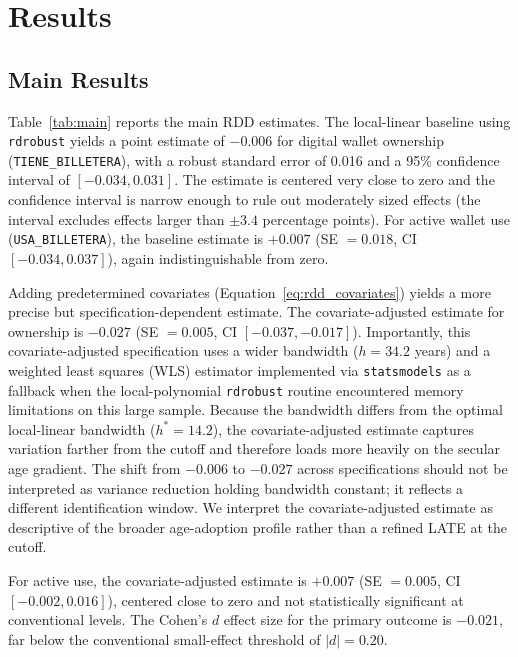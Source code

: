 \documentclass[12pt]{article}
\begin{document}
\section{Results}
\label{sec:results}

\subsection{Main Results}

Table~\ref{tab:main} reports the main RDD estimates. The local-linear baseline using \texttt{rdrobust} yields a point estimate of $-0.006$ for digital wallet ownership (\texttt{TIENE\_BILLETERA}), with a robust standard error of 0.016 and a 95\% confidence interval of $[-0.034, 0.031]$. The estimate is centered very close to zero and the confidence interval is narrow enough to rule out moderately sized effects (the interval excludes effects larger than $\pm 3.4$ percentage points). For active wallet use (\texttt{USA\_BILLETERA}), the baseline estimate is $+0.007$ (SE $=0.018$, CI $[-0.034, 0.037]$), again indistinguishable from zero.

Adding predetermined covariates (Equation~\ref{eq:rdd_covariates}) yields a more precise but specification-dependent estimate. The covariate-adjusted estimate for ownership is $-0.027$ (SE $=0.005$, CI $[-0.037, -0.017]$). Importantly, this covariate-adjusted specification uses a wider bandwidth ($h = 34.2$ years) and a weighted least squares (WLS) estimator implemented via \texttt{statsmodels} as a fallback when the local-polynomial \texttt{rdrobust} routine encountered memory limitations on this large sample. Because the bandwidth differs from the optimal local-linear bandwidth ($h^* = 14.2$), the covariate-adjusted estimate captures variation farther from the cutoff and therefore loads more heavily on the secular age gradient. The shift from $-0.006$ to $-0.027$ across specifications should not be interpreted as variance reduction holding bandwidth constant; it reflects a different identification window. We interpret the covariate-adjusted estimate as descriptive of the broader age-adoption profile rather than a refined LATE at the cutoff.

For active use, the covariate-adjusted estimate is $+0.007$ (SE $=0.005$, CI $[-0.002, 0.016]$), centered close to zero and not statistically significant at conventional levels. The Cohen's $d$ effect size for the primary outcome is $-0.021$, far below the conventional small-effect threshold of $|d|=0.20$.
\end{document}
